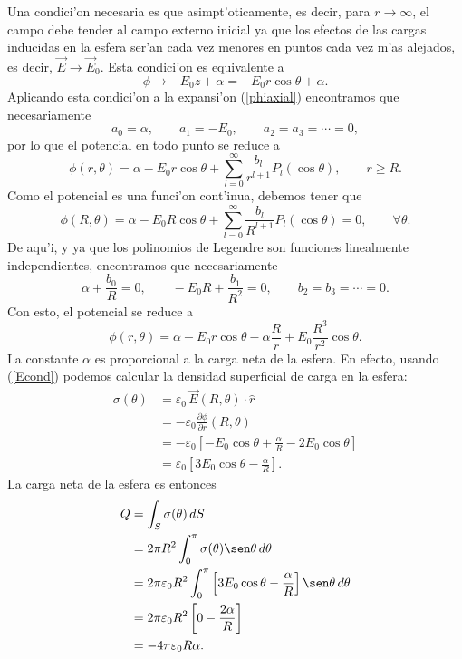 Una condici'on necesaria es que asimpt'oticamente, es decir, para $r\to\infty$, el campo debe tender al campo externo inicial ya que los efectos de las cargas inducidas en la esfera ser'an cada vez menores en puntos cada vez m'as alejados, es decir, $\vec{E}\to\vec{E}_0 $. Esta condici'on es equivalente a 
\begin{equation}
\phi\to -E_0z+\alpha=-E_0r\cos\theta+\alpha .
\end{equation}
Aplicando esta condici'on a la expansi'on (\ref{phiaxial}) encontramos que necesariamente
\begin{equation}
a_0=\alpha, \qquad a_1=-E_0, \qquad a_2=a_3=\cdots =0,
\end{equation}
por lo que el potencial en todo punto se reduce a 
\begin{equation}
\phi(r,\theta)=\alpha -E_0 r\cos\theta +
\sum_{l=0}^\infty\frac{b_l}{r^{l+1}}P_l(\cos\theta), \qquad r\ge R.
\end{equation}
Como el potencial es una funci'on cont'inua, debemos tener que
\begin{equation}
\phi(R,\theta)=\alpha -E_0 R\cos\theta +
\sum_{l=0}^\infty\frac{b_l}{R^{l+1}}P_l(\cos\theta)=0, \qquad \forall \theta.
\end{equation}
De aqu'i, y ya que los polinomios de Legendre son funciones linealmente independientes, encontramos que necesariamente
\begin{equation}
\alpha+\frac{b_0}{R}=0, \qquad -E_0R+\frac{b_1}{R^2}=0, \qquad b_2=b_3=\cdots =0.
\end{equation}
Con esto, el potencial se reduce a
\begin{equation}\label{phialpha}
\phi(r,\theta)=\alpha -E_0 r\cos\theta -\alpha\frac{R}{r}+E_0 \frac{R^3}{r^2}\cos\theta. 
\end{equation}
La constante $\alpha$ es proporcional a la carga neta de la esfera. En efecto, usando (\ref{Econd}) podemos calcular la densidad superficial de carga en la esfera:
\begin{align}
\sigma(\theta) &= \varepsilon_0\, \vec{E}(R,\theta)\cdot\hat{r} \\
&= -\varepsilon_0 \frac{\partial\phi}{\partial r}(R,\theta) \\
&= -\varepsilon_0\left[-E_0\cos\theta+\frac{\alpha}{R}-2E_0\cos\theta\right]\\
&= \varepsilon_0\left[3E_0\cos\theta-\frac{\alpha}{R}\right].
\end{align}
La carga neta de la esfera es entonces
\begin{align}
Q &= \int_S\sigma(\theta)\,dS \\
&= 2\pi R^2 \int_0^\pi \sigma(\theta)\sen\theta\,d\theta \\
&= 2\pi \varepsilon_0R^2 \int_0^\pi \left[3E_0\cos\theta-\frac{\alpha}{R}\right] \sen\theta\,d\theta \\
&= 2\pi \varepsilon_0R^2 \left[ 0-\frac{2\alpha}{R}\right] \\
&= -4\pi \varepsilon_0R \alpha .
\end{align}
